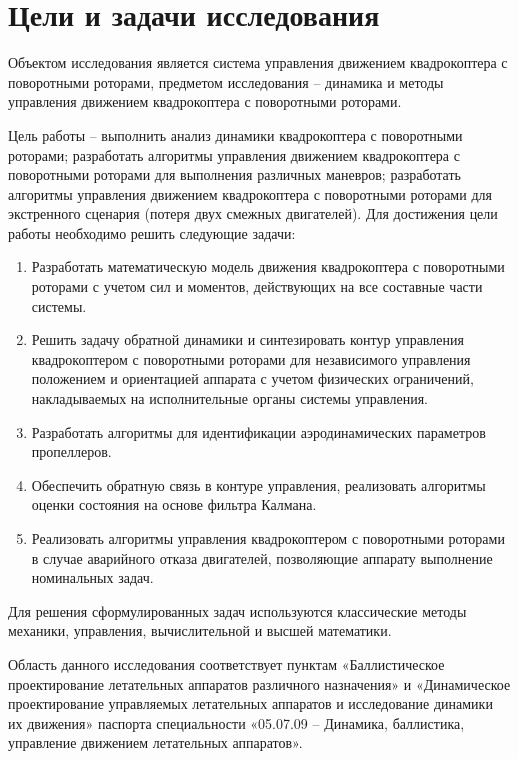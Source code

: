 \section{Цели и задачи исследования}

Объектом исследования является система управления движением квадрокоптера с поворотными роторами, предметом исследования -- динамика и методы управления движением квадрокоптера с поворотными роторами.

Цель работы -- выполнить анализ динамики квадрокоптера с поворотными роторами;
разработать алгоритмы управления движением квадрокоптера с поворотными роторами для выполнения различных маневров; разработать алгоритмы управления движением квадрокоптера с поворотными роторами для экстренного сценария (потеря двух смежных двигателей). Для достижения цели работы необходимо решить следующие задачи:
\begin{enumerate}
	\item Разработать математическую модель движения квадрокоптера с поворотными роторами с учетом сил и моментов, действующих на все составные части системы.
	\item Решить задачу обратной динамики и синтезировать контур управления квадрокоптером с поворотными роторами для независимого управления положением и ориентацией аппарата с учетом физических ограничений, накладываемых на исполнительные органы системы управления.
	\item Разработать алгоритмы для идентификации аэродинамических параметров пропеллеров.
	\item Обеспечить обратную связь в контуре управления, реализовать алгоритмы оценки состояния на основе фильтра Калмана.
	\item Реализовать алгоритмы управления квадрокоптером с поворотными роторами в случае аварийного отказа  двигателей, позволяющие аппарату выполнение номинальных задач.
\end{enumerate}
Для решения сформулированных задач используются классические методы механики, управления, вычислительной и высшей математики.

Область данного исследования соответствует пунктам «Баллистическое проектирование летательных аппаратов различного назначения» и «Динамическое проектирование управляемых летательных аппаратов и исследование динамики их движения» паспорта специальности «05.07.09 – Динамика, баллистика, управление движением летательных аппаратов».

